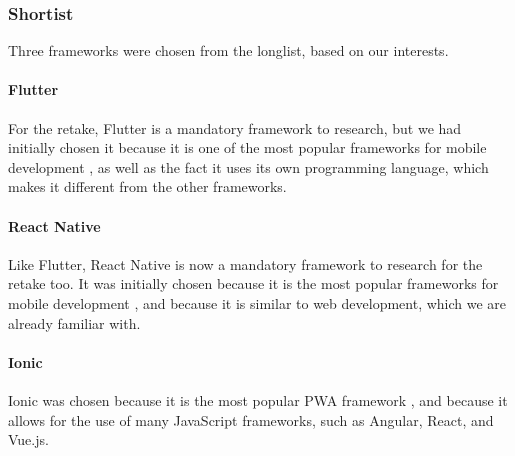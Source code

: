 \subsubsection{Shortist}
Three frameworks were chosen from the longlist, based on our interests.

\paragraph{Flutter}\label{subsubsec:frameworks-flutter}
For the retake, Flutter is a mandatory framework to research, but we had initially chosen it because it is one of the most popular frameworks for mobile development \cite{bib:most-popular-mobile-frameworks-2024}, as well as the fact it uses its own programming language, which makes it different from the other frameworks.

\paragraph{React Native}\label{subsubsec:frameworks-react-native}
Like Flutter, React Native is now a mandatory framework to research for the retake too.
It was initially chosen because it is the most popular frameworks for mobile development \cite{bib:most-popular-mobile-frameworks-2024}, and because it is similar to web development, which we are already familiar with.

\paragraph{Ionic}\label{subsubsec:frameworks-ionic}
Ionic was chosen because it is the most popular PWA framework \cite{bib:most-popular-mobile-frameworks-2024}, and because it allows for the use of many JavaScript frameworks, such as Angular, React, and Vue.js. \cite{bib:ionic-documentation}

